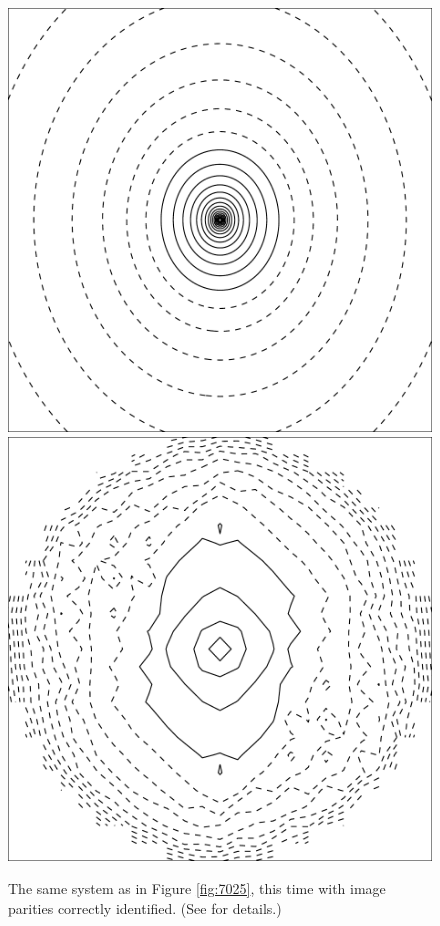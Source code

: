 \begin{figure}
  \includegraphics[width=\myplotswidth]{fig/ASW0000h2m_007022_kappa}
  \includegraphics[width=\myplotswidth]{fig/007022_mass}

  \caption[result 7022 (ASW0000h2m)]{The same system as in Figure
    \ref{fig:7025}, this time with image parities correctly
    identified. (See  for details.)}
  \label{fig:7022}
\end{figure}

